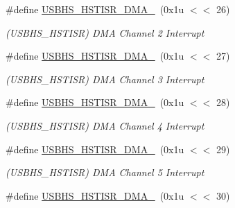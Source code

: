 \begin{DoxyCompactItemize}
\mbox{\label{group__SAMS70__USBHS_gab3f9d3b959cd003b4a776886a18ea4f1}} 
\#define \mbox{\hyperlink{group__SAMS70__USBHS_gab3f9d3b959cd003b4a776886a18ea4f1}{U\+S\+B\+H\+S\+\_\+\+H\+S\+T\+I\+S\+R\+\_\+\+D\+M\+A\+\_}}~(0x1u $<$$<$ 26)
\begin{DoxyCompactList}\small\item\em (U\+S\+B\+H\+S\+\_\+\+H\+S\+T\+I\+SR) D\+MA Channel 2 Interrupt \end{DoxyCompactList}\item 
\mbox{\label{group__SAMS70__USBHS_gaa2635d3ce3f79939b4bd49adc86c8cb5}} 
\#define \mbox{\hyperlink{group__SAMS70__USBHS_gaa2635d3ce3f79939b4bd49adc86c8cb5}{U\+S\+B\+H\+S\+\_\+\+H\+S\+T\+I\+S\+R\+\_\+\+D\+M\+A\+\_}}~(0x1u $<$$<$ 27)
\begin{DoxyCompactList}\small\item\em (U\+S\+B\+H\+S\+\_\+\+H\+S\+T\+I\+SR) D\+MA Channel 3 Interrupt \end{DoxyCompactList}\item 
\mbox{\label{group__SAMS70__USBHS_gaed42ea806678b1da3552cfaea2dd4d60}} 
\#define \mbox{\hyperlink{group__SAMS70__USBHS_gaed42ea806678b1da3552cfaea2dd4d60}{U\+S\+B\+H\+S\+\_\+\+H\+S\+T\+I\+S\+R\+\_\+\+D\+M\+A\+\_}}~(0x1u $<$$<$ 28)
\begin{DoxyCompactList}\small\item\em (U\+S\+B\+H\+S\+\_\+\+H\+S\+T\+I\+SR) D\+MA Channel 4 Interrupt \end{DoxyCompactList}\item 
\mbox{\label{group__SAMS70__USBHS_gaf0dbc9654f5ac451ec8bf9dcd61f4ba0}} 
\#define \mbox{\hyperlink{group__SAMS70__USBHS_gaf0dbc9654f5ac451ec8bf9dcd61f4ba0}{U\+S\+B\+H\+S\+\_\+\+H\+S\+T\+I\+S\+R\+\_\+\+D\+M\+A\+\_}}~(0x1u $<$$<$ 29)
\begin{DoxyCompactList}\small\item\em (U\+S\+B\+H\+S\+\_\+\+H\+S\+T\+I\+SR) D\+MA Channel 5 Interrupt \end{DoxyCompactList}\item 
\mbox{\label{group__SAMS70__USBHS_ga7b43811bc4572ab7cb7fc1399f71a7b3}} 
\#define \mbox{\hyperlink{group__SAMS70__USBHS_ga7b43811bc4572ab7cb7fc1399f71a7b3}{U\+S\+B\+H\+S\+\_\+\+H\+S\+T\+I\+S\+R\+\_\+\+D\+M\+A\+\_}}~(0x1u $<$$<$ 30)
$$
\end{DoxyCompactItemize}
